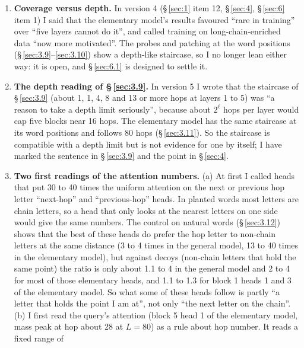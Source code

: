\documentclass[paper=a4,fontsize=11pt,DIV=11,parskip=half,headings=small,numbers=noendperiod]{scrartcl}
\DeclareRobustCommand{\lead}[1]{\textsf{\bfseries\color{accent}#1}}
\begin{document}
\begin{enumerate}
  example of the position-embedding block and that I had no seed that shows it. After finding that the saved
  picture in the original repo matches this checkpoint exactly, and you confirming it is Figure 5b, that was
  wrong. The blocks are at 72 and 120, not 45 (\S\,\ref{sec:3.8}).
\item \lead{Coverage versus depth.} In version 4 (\S\,\ref{sec:1} item 12, \S\,\ref{sec:4}, \S\,\ref{sec:6} item
  1) I said that the elementary model’s results favoured “rare in training” over “five layers cannot do it”, and
  called training on long-chain-enriched data “now more motivated”. The probes and patching at the word
  positions (\S\,\ref{sec:3.9}–\ref{sec:3.10}) show a depth-like staircase, so I no longer lean either way: it
  is open, and \S\,\ref{sec:6.1} is designed to settle it.
\item \lead{The depth reading of \S\,\ref{sec:3.9}.} In version 5 I wrote that the staircase of
  \S\,\ref{sec:3.9} (about 1, 1, 4, 8 and 13 or more hops at layers 1 to 5) was “a reason to take a depth limit
  seriously”, because about $2^\ell$ hops per layer would cap five blocks near 16 hops. The elementary model has
  the same staircase at its word positions and follows 80 hops (\S\,\ref{sec:3.11}). So the staircase is
  compatible with a depth limit but is not evidence for one by itself; I have marked the sentence in
  \S\,\ref{sec:3.9} and the point in \S\,\ref{sec:4}.
\item \lead{Two first readings of the attention numbers.} (a) At first I called heads that put 30 to 40 times
  the uniform attention on the next or previous hop letter “next-hop” and “previous-hop” heads. In planted words
  most letters are chain letters, so a head that only looks at the nearest letters on one side would give the
  same numbers. The control on natural words (\S\,\ref{sec:3.12}) shows that the best of these heads do prefer
  the hop letter to non-chain letters at the same distance (3 to 4 times in the general model, 13 to 40 times in
  the elementary model), but against decoys (non-chain letters that hold the same point) the ratio is only about
  1.1 to 4 in the general model and 2 to 4 for most of those elementary heads, and 1.1 to 1.3 for block 1 heads
  1 and 3 of the elementary model. So what some of these heads follow is partly “a letter that holds the point I
  am at”, not only “the next letter on the chain”. (b) I first read the query’s attention (block 5 head 1 of the
  elementary model, mass peak at hop about 28 at $L=80$) as a rule about hop number. It reads a fixed range of

\end{enumerate}
\end{document}
